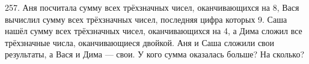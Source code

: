 257. Аня посчитала сумму всех трёхзначных чисел, оканчивающихся на 8, Вася вычислил сумму всех трёхзначных чисел, последняя цифра которых 9. Саша нашёл сумму всех трёхзначных чисел, оканчивающихся на 4, а Дима сложил все трёхзначные числа, оканчивающиеся двойкой. Аня и Саша сложили свои результаты, а Вася и Дима --- свои. У кого сумма оказалась больше? На сколько?\\

